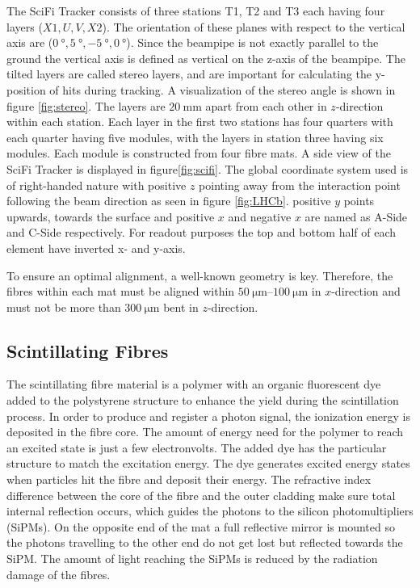 The SciFi Tracker consists of three stations T1, T2 and T3 each having four layers ($X1, U, V, X2$). The orientation of these planes with respect to the vertical axis are ($\SI{0}{\degree}, \SI{+5}{\degree}, \SI{-5}{\degree}, \SI{0}{\degree}$).
Since the beampipe is not exactly parallel to the ground the vertical axis is
defined as vertical on the z-axis of the beampipe.
The tilted layers are called stereo layers, and are important for calculating the y-position of hits during tracking. A visualization of the stereo angle is shown in figure \ref{fig:stereo}.
The layers are $\SI{20}{\milli\metre}$ apart from each other in $z$-direction within each station.
Each layer in the first two stations has four quarters with each quarter having five modules, with the layers in station three having six modules. Each module is constructed from four fibre mats.
A side view of the SciFi Tracker is displayed in figure\ref{fig:scifi}.
The global coordinate system used is of right-handed nature with positive $z$ pointing away from the interaction point following the beam direction as seen in figure \ref{fig:LHCb}. positive $y$ points upwards, towards the surface and positive $x$ and negative $x$ are named as A-Side and C-Side respectively\cite{scifiInfo}.
For readout purposes the top and bottom half of each element have inverted x- and y-axis.

To ensure an optimal alignment, a well-known geometry is key. Therefore, the
fibres within each mat must be aligned within $\SIrange{50}{100}{\micro\metre}$ in $x$-direction and must not be more than $\SI{300}{\micro\metre}$ bent in $z$-direction.

\subsection{Scintillating Fibres}
The scintillating fibre material is a polymer with an organic fluorescent dye
added to the polystyrene structure to enhance the yield during the scintillation process.
In order to produce and register a photon signal, the ionization energy is deposited
in the fibre core. The amount of energy need for the polymer to reach an
excited state is just a few electronvolts\cite{Elevel}. The added dye has the particular structure
to match the excitation energy. The dye generates excited energy states when
particles hit the fibre and deposit their energy.
The refractive index difference between the core of the fibre and the outer cladding make sure total internal reflection occurs, which guides the photons to the silicon photomultipliers (SiPMs).
On the opposite end of the mat a full reflective mirror is mounted so the photons travelling to the other end do not get lost but reflected towards the SiPM.
The amount of light reaching the SiPMs is reduced by the radiation damage of the fibres.
